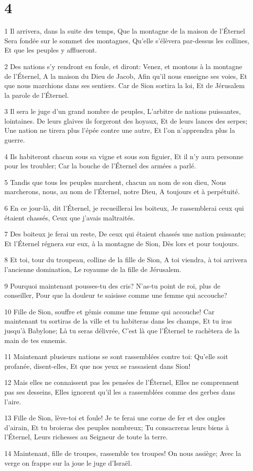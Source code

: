\chapter{4}

\par 1 Il arrivera, dans la suite des temps, Que la montagne de la maison de l'Éternel Sera fondée sur le sommet des montagnes, Qu'elle s'élèvera par-dessus les collines, Et que les peuples y afflueront.
\par 2 Des nations s'y rendront en foule, et diront: Venez, et montons à la montagne de l'Éternel, A la maison du Dieu de Jacob, Afin qu'il nous enseigne ses voies, Et que nous marchions dans ses sentiers. Car de Sion sortira la loi, Et de Jérusalem la parole de l'Éternel.
\par 3 Il sera le juge d'un grand nombre de peuples, L'arbitre de nations puissantes, lointaines. De leurs glaives ils forgeront des hoyaux, Et de leurs lances des serpes; Une nation ne tirera plus l'épée contre une autre, Et l'on n'apprendra plus la guerre.
\par 4 Ils habiteront chacun sous sa vigne et sous son figuier, Et il n'y aura personne pour les troubler; Car la bouche de l'Éternel des armées a parlé.
\par 5 Tandis que tous les peuples marchent, chacun au nom de son dieu, Nous marcherons, nous, au nom de l'Éternel, notre Dieu, A toujours et à perpétuité.
\par 6 En ce jour-là, dit l'Éternel, je recueillerai les boiteux, Je rassemblerai ceux qui étaient chassés, Ceux que j'avais maltraités.
\par 7 Des boiteux je ferai un reste, De ceux qui étaient chassés une nation puissante; Et l'Éternel régnera sur eux, à la montagne de Sion, Dès lors et pour toujours.
\par 8 Et toi, tour du troupeau, colline de la fille de Sion, A toi viendra, à toi arrivera l'ancienne domination, Le royaume de la fille de Jérusalem.
\par 9 Pourquoi maintenant pousses-tu des cris? N'as-tu point de roi, plus de conseiller, Pour que la douleur te saisisse comme une femme qui accouche?
\par 10 Fille de Sion, souffre et gémis comme une femme qui accouche! Car maintenant tu sortiras de la ville et tu habiteras dans les champs, Et tu iras jusqu'à Babylone; Là tu seras délivrée, C'est là que l'Éternel te rachètera de la main de tes ennemis.
\par 11 Maintenant plusieurs nations se sont rassemblées contre toi: Qu'elle soit profanée, disent-elles, Et que nos yeux se rassasient dans Sion!
\par 12 Mais elles ne connaissent pas les pensées de l'Éternel, Elles ne comprennent pas ses desseins, Elles ignorent qu'il les a rassemblées comme des gerbes dans l'aire.
\par 13 Fille de Sion, lève-toi et foule! Je te ferai une corne de fer et des ongles d'airain, Et tu broieras des peuples nombreux; Tu consacreras leurs biens à l'Éternel, Leurs richesses au Seigneur de toute la terre.
\par 14 Maintenant, fille de troupes, rassemble tes troupes! On nous assiège; Avec la verge on frappe sur la joue le juge d'Israël.

